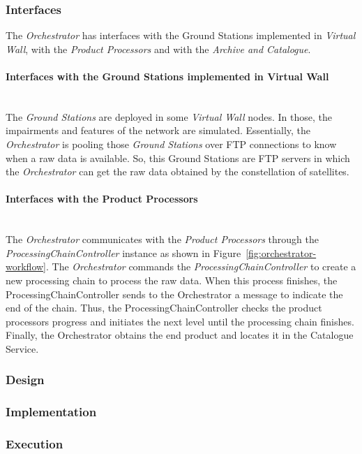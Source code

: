 \begin{enumerate}
\subsubsection{Interfaces}

The \emph{Orchestrator} has interfaces with the Ground Stations implemented in
\emph{Virtual Wall}, with the \emph{Product Processors} and with the
\emph{Archive and Catalogue}.
\paragraph{Interfaces with the Ground Stations implemented in Virtual Wall}~\\
The \emph{Ground Stations} are deployed in some \emph{Virtual Wall} nodes. In those, the impairments and features of the network are simulated. Essentially, the \emph{Orchestrator} is pooling those \emph{Ground Stations} over \ac{FTP} connections to know when a raw data is available. So, this Ground Stations are \ac{FTP} servers in which the \emph{Orchestrator} can get the raw data obtained by the constellation of satellites.
\paragraph{Interfaces with the Product Processors}~\\
The \emph{Orchestrator} communicates with the \emph{Product Processors} through the \emph{ProcessingChainController} instance as shown in Figure~\ref{fig:orchestrator-workflow}. The \emph{Orchestrator} commands the \emph{ProcessingChainController} to create a new processing chain to process the raw data. When this process finishes, the ProcessingChainController sends to the Orchestrator a message to indicate the end of the chain. Thus, the ProcessingChainController checks the product processors progress and initiates the next level until the processing chain finishes. Finally, the Orchestrator obtains the end product and locates it in the Catalogue Service. 

\subsubsection{Design}

\subsubsection{Implementation}

\subsubsection{Execution}


\end{enumerate}
